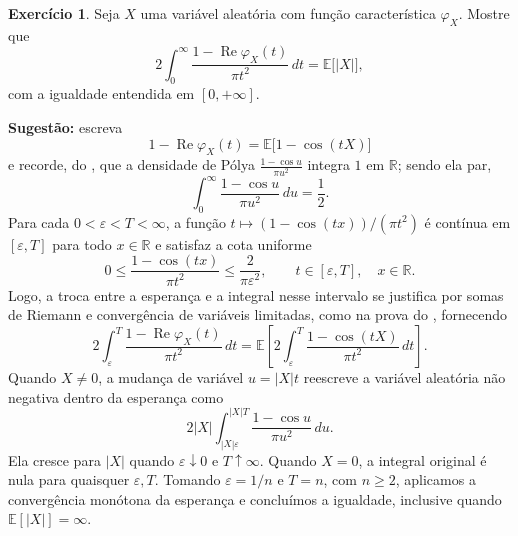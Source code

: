\documentclass[12pt,portuguese]{article}
\theoremstyle{definition}
\theoremstyle{plainexercise}
\theoremstyle{starredexercise}
\newtheorem{starredexercise}[exercise]{Exercício}
\theoremstyle{definition}
\begin{document}
\begin{starredexercise}\label{exercise:primeiro-momento}
Seja $X$ uma variável aleatória com função característica $\varphi_X$. Mostre que
\[
  2\int_0^\infty\frac{1-\operatorname{Re}\varphi_X(t)}{\pi t^2}\,dt=\mathbb{E}\bigl[|X|\bigr],
\]
com a igualdade entendida em $[0,+\infty]$.

\noindent\textbf{Sugestão:} escreva
\[
1-\operatorname{Re}\varphi_X(t)
=\mathbb{E}\bigl[1-\cos(tX)\bigr]
\]
e recorde, do , que a densidade de Pólya
$\frac{1-\cos u}{\pi u^2}$ integra $1$ em $\mathbb{R}$; sendo ela par,
\[
  \int_0^\infty\frac{1-\cos u}{\pi u^2}\,du=\frac12 .
\]
Para cada $0<\varepsilon<T<\infty$, a função
$t\mapsto(1-\cos(tx))/(\pi t^2)$ é contínua em $[\varepsilon,T]$ para todo
$x\in\mathbb{R}$ e satisfaz a cota uniforme
\[
0\leqslant\frac{1-\cos(tx)}{\pi t^2}\leqslant\frac{2}{\pi\varepsilon^2},
\qquad t\in[\varepsilon,T],\quad x\in\mathbb{R}.
\]
Logo, a troca entre a esperança e a integral nesse intervalo se justifica
por somas de Riemann e convergência de variáveis limitadas, como na prova do
, fornecendo
\[
  2\int_\varepsilon^T\frac{1-\operatorname{Re}\varphi_X(t)}{\pi t^2}\,dt
  =\mathbb{E}\left[2\int_\varepsilon^T\frac{1-\cos(tX)}{\pi t^2}\,dt\right].
\]
Quando $X\neq0$, a mudança de variável $u=|X|t$ reescreve a variável aleatória
não negativa dentro da esperança como
\[
2|X|\int_{|X|\varepsilon}^{|X|T}\frac{1-\cos u}{\pi u^2}\,du.
\]
Ela cresce para $|X|$ quando $\varepsilon\downarrow0$ e $T\uparrow\infty$.
Quando $X=0$, a integral original é nula para quaisquer $\varepsilon,T$.
Tomando $\varepsilon=1/n$ e $T=n$, com $n\geqslant2$, aplicamos a
convergência monótona da esperança e concluímos a igualdade, inclusive
quando $\mathbb{E}[|X|]=\infty$.
\end{starredexercise}
\end{document}
